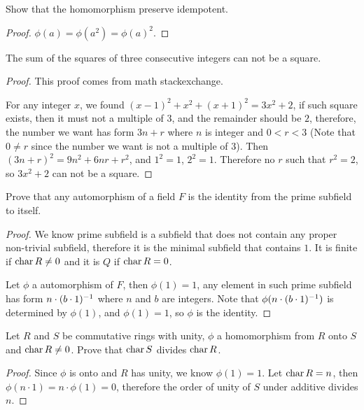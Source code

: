 \documentclass[../main.tex]{subfiles}
\begin{document}
\setcounter{exercise}{22}
\begin{exercise}
  Show that the homomorphism preserve idempotent.
\end{exercise}
\begin{proof}
  $\phi(a) = \phi(a^2) = \phi(a)^2$.
\end{proof}

\setcounter{exercise}{35}
\begin{exercise}
  The sum of the squares of three consecutive integers 
  can not be a square.
\end{exercise}
\begin{proof}
  This proof comes from math stackexchange. \par
  For any integer $x$, we found $(x - 1)^2 + x^2 + (x + 1)^2 = 3x^2 + 2$,
  if such square exists, then it must not a multiple of $3$,
  and the remainder should be $2$, therefore, 
  the number we want has form $3n + r$ where $n$ is integer and $0 < r < 3$ 
  (Note that $0 \neq r$ since the number we want is not a multiple of $3$).
  Then $(3n + r)^2 = 9n^2 + 6nr + r^2$, and $1^2 = 1$, $2^2 = 1$.
  Therefore no $r$ such that $r^2 = 2$, so $3x^2 + 2$ can not be a square.
\end{proof}

\setcounter{exercise}{45}
\begin{exercise}
  Prove that any automorphism of a field $F$ is the identity
  from the prime subfield to itself.
\end{exercise}
\begin{proof}
  We know prime subfield is a subfield that does not contain any
  proper non-trivial subfield, therefore it is
  the minimal subfield that contains $1$.
  It is finite if $\operatorname{char} R \neq 0$ and it is $Q$ if $\operatorname{char} R = 0$.

  Let $\phi$ a automorphism of $F$, then $\phi(1) = 1$,
  any element in such prime subfield has form $n \cdot (b \cdot 1)^{-1}$
  where $n$ and $b$ are integers. Note that $\phi(n \cdot (b \cdot 1)^{-1})$ is determined by $\phi(1)$,
  and $\phi(1) = 1$, so $\phi$ is the identity.
\end{proof}

\setcounter{exercise}{48}
\begin{exercise}
  Let $R$ and $S$ be commutative rings with unity,
  $\phi$ a homomorphism from $R$ onto $S$ and $\operatorname{char} R \neq 0$.
  Prove that $\operatorname{char} S$ divides $\operatorname{char} R$.
\end{exercise}
\begin{proof}
  Since $\phi$ is onto and $R$ has unity, we know $\phi(1) = 1$.
  Let $\operatorname{char} R = n$, then $\phi(n \cdot 1) = n \cdot \phi(1) = 0$,
  therefore the order of unity of $S$ under additive divides $n$.
\end{proof}
\end{document}

